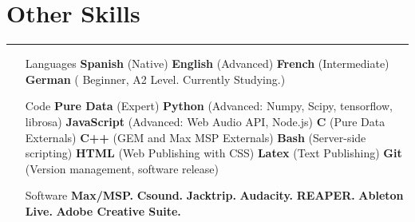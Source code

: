 \documentclass[12pt]{article}%
\begin{document}
%
\section{Other Skills}%
\label{sec:OtherSkills}%
\hrule%
\begin{itemize}[align=parleft,leftmargin=2.25cm,labelwidth=2cm]
\item[Languages]
\textbf{Spanish}
 (Native) 
\textbf{English}
 (Advanced) 
\textbf{French}
 (Intermediate) 
\textbf{German}
 ( Beginner, A2 Level. Currently Studying.) 
\item[Code]
\textbf{Pure Data}
 (Expert) 
\textbf{Python}
 (Advanced: Numpy, Scipy, tensorflow, librosa) 
\textbf{JavaScript}
 (Advanced: Web Audio API, Node.js) 
\textbf{C}
 (Pure Data Externals) 
\textbf{C++}
 (GEM and Max MSP Externals) 
\textbf{Bash}
 (Server{-}side scripting) 
\textbf{HTML}
 (Web Publishing with CSS) 
\textbf{Latex}
 (Text Publishing) 
\textbf{Git}
 (Version management, software release) 
\item[Software]
\textbf{Max/MSP.}
\textbf{Csound.}
\textbf{Jacktrip.}
\textbf{Audacity.}
\textbf{REAPER.}
\textbf{Ableton Live.}
\textbf{Adobe Creative Suite.}
\end{itemize}

%
\end{document}
